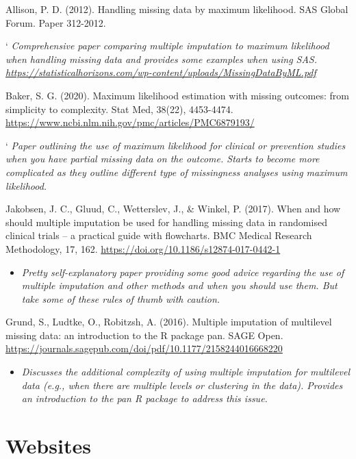 \documentclass[
]{book}
\providecommand{\tightlist}{%
  \setlength{\itemsep}{0pt}\setlength{\parskip}{0pt}}
\begin{document}
Allison, P. D. (2012). Handling missing data by maximum likelihood. SAS Global Forum. Paper 312-2012.

` \emph{Comprehensive paper comparing multiple imputation to maximum likelihood when handling missing data and provides some examples when using SAS. \url{https://statisticalhorizons.com/wp-content/uploads/MissingDataByML.pdf} }

Baker, S. G. (2020). Maximum likelihood estimation with missing outcomes: from simplicity to complexity. Stat Med, 38(22), 4453-4474. \url{https://www.ncbi.nlm.nih.gov/pmc/articles/PMC6879193/}

` \emph{Paper outlining the use of maximum likelihood for clinical or prevention studies when you have partial missing data on the outcome. Starts to become more complicated as they outline different type of missingness analyses using maximum likelihood. }

Jakobsen, J. C., Gluud, C., Wetterslev, J., \& Winkel, P. (2017). When and how should multiple imputation be used for handling missing data in randomised clinical trials -- a practical guide with flowcharts. BMC Medical Research Methodology, 17, 162. \url{https://doi.org/10.1186/s12874-017-0442-1}

\begin{itemize}
\tightlist
\item
  \emph{Pretty self-explanatory paper providing some good advice regarding the use of multiple imputation and other methods and when you should use them. But take some of these rules of thumb with caution. }
\end{itemize}

Grund, S., Ludtke, O., Robitzsh, A. (2016). Multiple imputation of multilevel missing data: an introduction to the R package pan. SAGE Open. \url{https://journals.sagepub.com/doi/pdf/10.1177/2158244016668220}

\begin{itemize}
\tightlist
\item
  \emph{Discusses the additional complexity of using multiple imputation for multilevel data (e.g., when there are multiple levels or clustering in the data). Provides an introduction to the pan R package to address this issue. }
\end{itemize}

\section{Websites}\label{websites-4}
\end{document}
